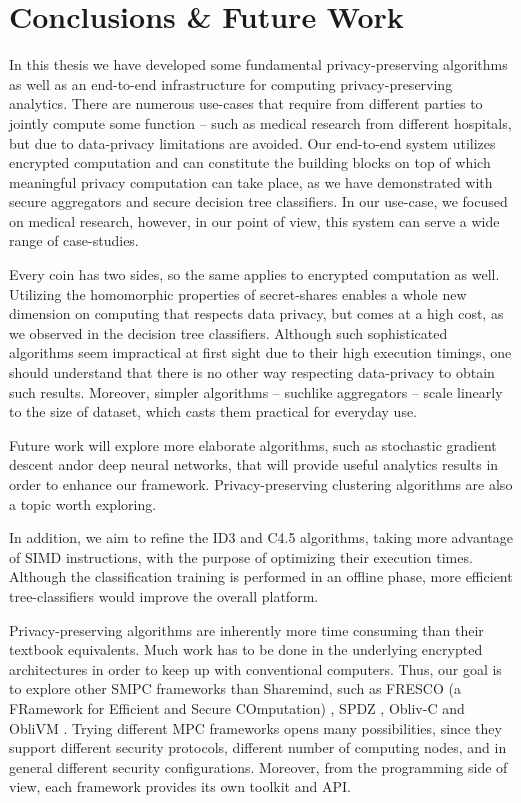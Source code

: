 \chapter{Conclusions \& Future Work}\label{c:conclusions}
In this thesis we have developed some fundamental privacy\hyp preserving algorithms as well as an end\hyp to\hyp end infrastructure for computing privacy\hyp preserving analytics.
There are numerous use\hyp cases that require from different parties to jointly compute some function -- such as medical research from different hospitals, but due to data\hyp privacy limitations are avoided.
Our end\hyp to\hyp end system utilizes encrypted computation and can constitute the building blocks on top of which meaningful privacy computation can take place, as we have demonstrated with secure aggregators and secure decision tree classifiers.
In our use\hyp case, we focused on medical research, however, in our point of view, this system can serve a wide range of case\hyp studies.


Every coin has two sides, so the same applies to encrypted computation as well.
Utilizing the homomorphic properties of secret\hyp shares enables a whole new dimension on computing that respects data privacy, but comes at a high cost, as we observed in the decision tree classifiers.
Although such sophisticated algorithms seem impractical at first sight due to their high execution timings, one should understand that there is no other way respecting data\hyp privacy to obtain such results.
Moreover, simpler algorithms -- suchlike aggregators -- scale linearly to the size of dataset, which casts them practical for everyday use.


Future work will explore more elaborate algorithms, such as stochastic gradient descent \cite{shokri2015privacy} and\myslash or deep neural networks, that will provide useful analytics results in order to enhance our framework.
Privacy\hyp preserving clustering algorithms \cite{jha2005privacy, upmanyu2010efficient, jagannathan2006new} are also a topic worth exploring.


In addition, we aim to refine the ID3 and C4.5 algorithms, taking more advantage of SIMD instructions, with the purpose of optimizing their execution times.
Although the classification training is performed in an offline phase, more efficient tree\hyp classifiers would improve the overall platform.


Privacy\hyp preserving algorithms are inherently more time consuming than their textbook equivalents.
Much work has to be done in the underlying encrypted architectures in order to keep up with conventional computers.
Thus, our goal is to explore other SMPC frameworks than Sharemind, such as FRESCO (a FRamework for Efficient and Secure COmputation) \cite{chan2017privacy, alxd1}, SPDZ \cite{damgaard2012multiparty, damgaard2013practical}, Obliv\hyp C \cite{zahur2015obliv} and ObliVM \cite{liu2015oblivm}.
Trying different MPC frameworks opens many possibilities, since they support different security protocols, different number of computing nodes, and in general different security configurations.
Moreover, from the programming side of view, each framework provides its own toolkit and API. 


